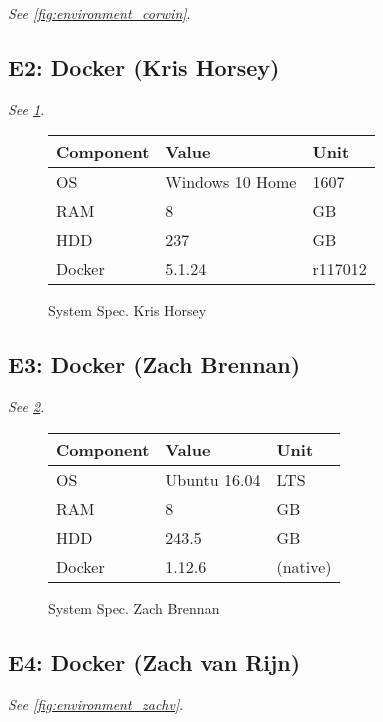 \documentclass[letterpaper]{article}
\begin{document}
\emph{See \cref{fig:environment_corwin}}.

\subsection{E2: Docker (Kris Horsey)}
\label{sec:environment_kris}
\emph{See \cref{fig:environment_kris}}.

\begin{figure}
\centering
\begin{tabulary}{\linewidth}{LLL}
    Component & Value         & Unit     \\
    \hline
    OS     	  & Windows 10 Home & 1607      \\
    RAM       & 8               & GB       \\
    HDD       & 237        	    & GB       \\
    Docker    & 5.1.24          & r117012 \\
\end{tabulary}
\caption{System Spec. Kris Horsey}
\label{fig:environment_kris}
\end{figure}

\subsection{E3: Docker (Zach Brennan)}
\label{sec:environment_zachb}

\emph{See \cref{fig:environment_zachb}}.

\begin{figure}
\centering
\begin{tabulary}{\linewidth}{LLL}
    Component & Value         & Unit     \\
    \hline
    OS     	  & Ubuntu 16.04  & LTS      \\
    RAM       & 8             & GB       \\
    HDD       & 243.5      	  & GB       \\
    Docker    & 1.12.6        & (native) \\
\end{tabulary}
\caption{System Spec. Zach Brennan}
\label{fig:environment_zachb}
\end{figure}

\subsection{E4: Docker (Zach van Rijn)}
\label{sec:environment_zachv}

\emph{See \cref{fig:environment_zachv}}.
\end{document}
